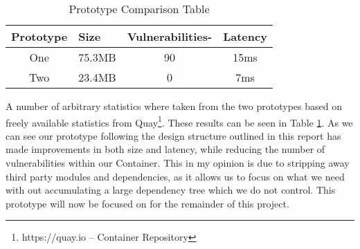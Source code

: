 \begin{table}[!ht]
\centering
\begin{tabular}{cccc}
\hline
\multicolumn{1}{l}{Prototype} & \multicolumn{1}{l}{Size} & \multicolumn{1}{l}{Vulnerabilities-} & \multicolumn{1}{l}{Latency} \\ \hline
One & 75.3MB & 90 & 15ms \\
Two & 23.4MB & 0 & 7ms \\ \hline
\end{tabular}
\caption{Prototype Comparison Table}
\label{table-comp}
\end{table}
A number of arbitrary statistics where taken from the two prototypes based on freely available statistics from \gls{Quay}\footnote{https://quay.io -- Container Repository}. These results can be seen in Table \ref{table-comp}. As we can see our prototype following the design structure outlined in this report has made improvements in both size and latency, while reducing the number of vulnerabilities within our \gls{Container}. This in my opinion is due to stripping away third party modules and dependencies, as it allows us to focus on what we need with out accumulating a large dependency tree which we do not control. This prototype will now be focused on for the remainder of this project.

